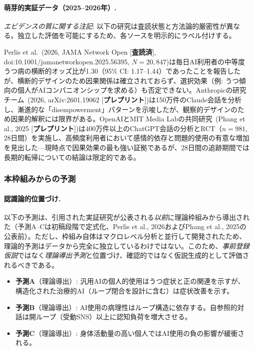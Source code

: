 \documentclass[a4paper,11pt,titlepage]{article}
\begin{document}
\paragraph{萌芽的実証データ（2025--2026年）.}
\textit{エビデンスの質に関する注記}: 以下の研究は査読状態と方法論的厳密性が異なる。独立した評価を可能にするため、各ソースを明示的にラベル付けする。

Perlis et al.~(2026, JAMA Network Open [\textbf{査読済}], doi:10.1001/jamanetworkopen.2025.56395, $N=20{,}847$)は毎日AI利用者の中等度うつ病の横断的オッズ比が1.30（95\% CI: 1.17--1.44）であったことを報告したが、横断的デザインのため因果関係は確立されておらず、選択効果（例: うつ傾向の個人がAIコンパニオンシップを求める）も否定できない。Anthropicの研究チーム~(2026, arXiv:2601.19062 [\textbf{プレプリント}])は150万件のClaude会話を分析し、漸進的な「disempowerment」パターンを示唆したが、観察的デザインのため因果的解釈には限界がある。OpenAIとMIT Media Labの共同研究~(Phang et al., 2025 [\textbf{プレプリント}])は400万件以上のChatGPT会話の分析とRCT（$n=981$, 28日間）を実施し、高頻度利用者において感情的依存と問題的使用の有意な増加を見出した---現時点で因果効果の最も強い証拠であるが、28日間の追跡期間では長期的転帰についての結論は限定的である。

\subsubsection{本枠組みからの予測}

\paragraph{認識論的位置づけ.}
以下の予測は、引用された実証研究が公表される\emph{以前}に理論枠組みから導出された（予測A--Cは初稿段階で定式化、Perlis et al., 2026およびPhang et al., 2025の公表前）。ただし、枠組み自体はマクロレベル分析と並行して開発されたため、理論的予測はデータから完全に独立しているわけではない。このため、\emph{事前登録仮説}ではなく\emph{理論導出予測}と位置づけ、確認的ではなく仮説生成的として評価されるべきである。

\begin{itemize}
  \item \textbf{予測A}（理論導出）: 汎用AIの個人的使用はうつ症状と正の関連を示すが、構造化された治療的AI（ループ閉合を設計に含む）は症状改善を示す。
  \item \textbf{予測B}（理論導出）: AI使用の病理性はループ構造に依存する。自参照的対話は開ループ（受動SNS）以上に認知負荷を増大させる。
  \item \textbf{予測C}（理論導出）: 身体活動量の高い個人ではAI使用の負の影響が緩衝される。
\end{itemize}
\end{document}

